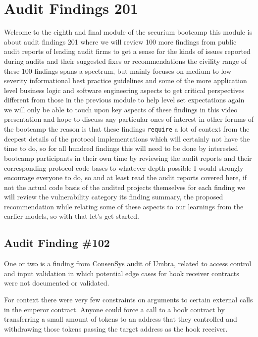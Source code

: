 \chapter{Audit Findings 201}

\setcounter{subsection}{101}

Welcome to the eighth and final module of the securium bootcamp this module is about audit findings 201 where we will review 100 more findings from public audit reports of leading audit firms to get a sense for the kinds of issues reported during audits and their suggested fixes or recommendations the civility range of these 100 findings spans a spectrum, but mainly focuses on medium to low severity informational best practice guidelines and some of the more application level business logic and software engineering aspects to get critical perspectives different from those in the previous module to help level set expectations again we will only be able to touch upon key aspects of these findings in this video presentation and hope to discuss any particular ones of interest in other forums of the bootcamp the reason is that these findings \verb|require| a lot of context from the deepest details of the protocol implementations which will certainly not have the time to do, so for all hundred findings this will need to be done by interested bootcamp participants in their own time by reviewing the audit reports and their corresponding protocol code bases to whatever depth possible I would strongly encourage everyone to do, so and at least read the audit reports covered here, if not the actual code basis of the audited projects themselves for each finding we will review the vulnerability category its finding summary, the proposed recommendation while relating some of these aspects to our learnings from the earlier models, so with that let's get started.

\section{Audit Finding \#102}

One or two is a finding from ConsenSys audit of Umbra, related to access control and input validation in which potential edge cases for hook receiver contracts were not documented or validated.

For context there were very few constraints on arguments to certain external calls in the emperor contract. Anyone could force a call to a hook contract by transferring a small amount of tokens to an address that they controlled and withdrawing those tokens passing the target address as the hook receiver. 

